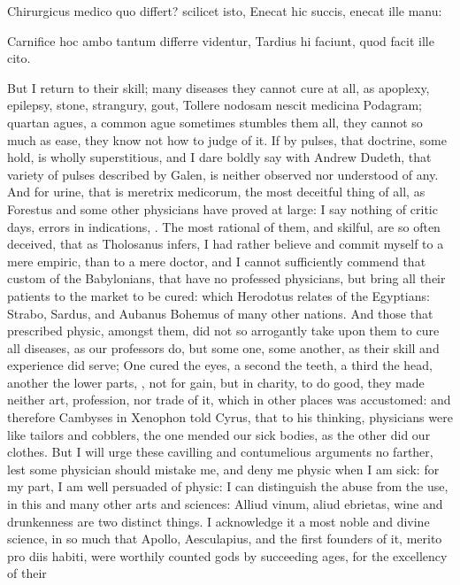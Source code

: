 {Chirurgicus medico quo differt? scilicet isto,
Enecat hic succis, enecat ille manu:

Carnifice hoc ambo tantum differre videntur,
Tardius hi faciunt, quod facit ille cito.

But I return to their skill; many diseases they cannot cure at all, as
apoplexy, epilepsy, stone, strangury, gout, Tollere nodosam nescit
medicina Podagram; quartan agues, a common ague sometimes
stumbles them all, they cannot so much as ease, they know not how to
judge of it. If by pulses, that doctrine, some hold, is wholly
superstitious, and I dare boldly say with Andrew Dudeth, that
variety of pulses described by Galen, is neither observed nor
understood of any. And for urine, that is meretrix medicorum, the most
deceitful thing of all, as Forestus and some other physicians have
proved at large: I say nothing of critic days, errors in indications,
\etc{}. The most rational of them, and skilful, are so often deceived, that
as Tholosanus infers, I had rather believe and commit myself to a
mere empiric, than to a mere doctor, and I cannot sufficiently commend
that custom of the Babylonians, that have no professed physicians, but
bring all their patients to the market to be cured: which Herodotus
relates of the Egyptians: Strabo, Sardus, and Aubanus Bohemus of many
other nations. And those that prescribed physic, amongst them, did not
so arrogantly take upon them to cure all diseases, as our professors
do, but some one, some another, as their skill and experience did
serve;  One cured the eyes, a second the teeth, a third the head,
another the lower parts, \etc{}, not for gain, but in charity, to do good,
they made neither art, profession, nor trade of it, which in other
places was accustomed: and therefore Cambyses in Xenophon told
Cyrus, that to his thinking, physicians were like tailors and cobblers,
the one mended our sick bodies, as the other did our clothes. But I
will urge these cavilling and contumelious arguments no farther, lest
some physician should mistake me, and deny me physic when I am sick:
for my part, I am well persuaded of physic: I can distinguish the abuse
from the use, in this and many other arts and sciences: Alliud
vinum, aliud ebrietas, wine and drunkenness are two distinct things. I
acknowledge it a most noble and divine science, in so much that Apollo,
Aesculapius, and the first founders of it, merito pro diis habiti, were
worthily counted gods by succeeding ages, for the excellency of their
}
